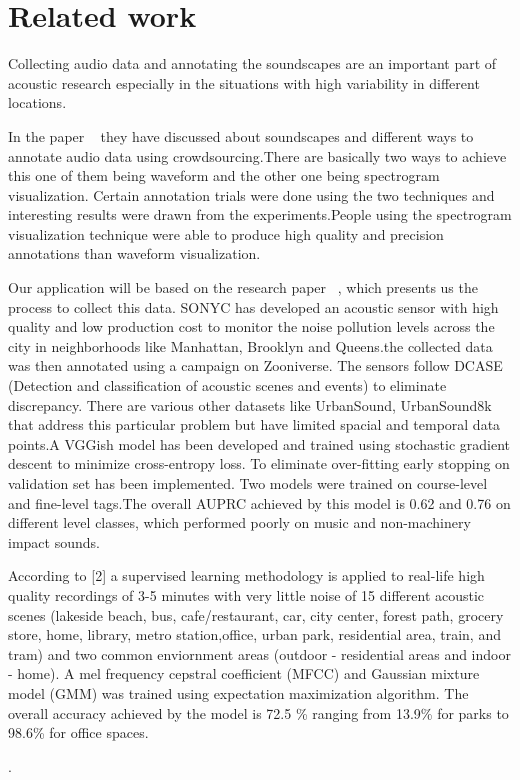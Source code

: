 
\section{Related work}
Collecting audio data and annotating the soundscapes are an important part of acoustic research especially in the situations with high variability in different locations.

In the paper ~\cite{5} they have discussed about soundscapes and different ways to annotate audio data using crowdsourcing.There are basically two ways to achieve this one of them being waveform and the other one being spectrogram visualization. Certain annotation trials were done using the two techniques and interesting results were drawn from the experiments.People using the spectrogram visualization technique were able to produce high quality and precision annotations than waveform visualization.    

Our application will be based on the research paper~ \cite{4}, which presents us the process to collect this data. SONYC has developed an acoustic sensor with high quality and low production cost to monitor the noise pollution levels across the city in neighborhoods like Manhattan, Brooklyn and Queens.the collected data was then annotated using a campaign on Zooniverse. The sensors follow DCASE (Detection and classification of acoustic scenes and events) to eliminate discrepancy. There are various other datasets like UrbanSound, UrbanSound8k that address this particular problem but have limited spacial and temporal data points.A VGGish model has been developed and trained using stochastic gradient descent to minimize cross-entropy loss. To eliminate over-fitting early stopping on validation set has been implemented. Two models were trained on course-level and fine-level tags.The overall AUPRC achieved by this model is 0.62 and 0.76 on different level classes, which performed poorly on music and non-machinery impact sounds.

According to [2] a supervised learning methodology is applied to real-life high quality recordings of 3-5 minutes with very little noise of 15 different acoustic scenes (lakeside beach, bus, cafe/restaurant, car, city center, forest path, grocery store, home, library, metro station,office, urban park, residential area, train, and tram) and two common enviornment areas (outdoor - residential areas and indoor - home). A mel frequency cepstral coefficient (MFCC) and Gaussian mixture model (GMM) was trained using expectation maximization algorithm. The overall accuracy achieved by the model is 72.5 \% ranging from 13.9\% for parks to 98.6\% for office spaces.

. 
